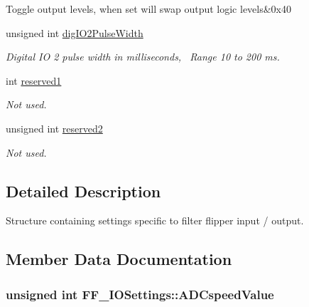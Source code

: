 \begin{DoxyCompactItemize}
\begin{DoxyCompactList}
\begin{longtabu}
Toggle output levels, when set will swap output logic levels&0x40 \\
\end{longtabu}
\end{DoxyCompactList}\item 
unsigned int \hyperlink{struct_f_f___i_o_settings_aae927b35d444d86cfc71e04922f6eb3b}{dig\+I\+O2\+Pulse\+Width}
\begin{DoxyCompactList}\small\item\em Digital IO 2 pulse width in milliseconds,~\newline
 Range 10 to 200 ms. \end{DoxyCompactList}\item 
int \hyperlink{struct_f_f___i_o_settings_a230390646e0c21d2873a86a6a54abf05}{reserved1}
\begin{DoxyCompactList}\small\item\em Not used. \end{DoxyCompactList}\item 
unsigned int \hyperlink{struct_f_f___i_o_settings_ad0782e694f6b52650d9ca129cbad623f}{reserved2}
\begin{DoxyCompactList}\small\item\em Not used. \end{DoxyCompactList}\end{DoxyCompactItemize}


\subsection{Detailed Description}
Structure containing settings specific to filter flipper input / output. 



\subsection{Member Data Documentation}
\subsubsection[{\texorpdfstring{A\+D\+Cspeed\+Value}{ADCspeedValue}}]{\setlength{\rightskip}{0pt plus 5cm}unsigned int F\+F\+\_\+\+I\+O\+Settings\+::\+A\+D\+Cspeed\+Value}\hypertarget{struct_f_f___i_o_settings_a6f718d677ca4d6e60e666f50619a890c}{}\label{struct_f_f___i_o_settings_a6f718d677ca4d6e60e666f50619a890c}


